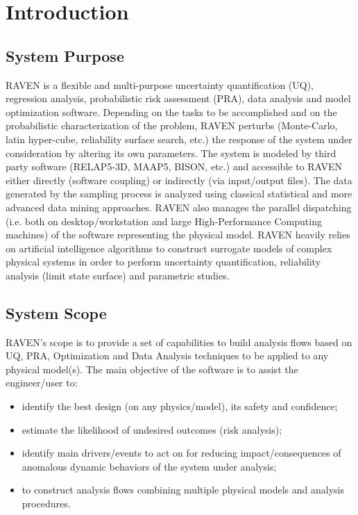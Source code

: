 \section{Introduction}
\subsection{System Purpose}

RAVEN is a flexible and multi-purpose uncertainty quantification (UQ), regression analysis, probabilistic risk assessment 
(PRA), data analysis and model optimization software.  Depending on the tasks to be accomplished and on the 
probabilistic
 characterization of the problem, RAVEN perturbs (Monte-Carlo, latin hyper-cube, reliability surface search, etc.) the
 response of the system under consideration by altering its own parameters. The system is modeled by third party
 software (RELAP5-3D, MAAP5, BISON, etc.) and accessible to RAVEN either directly (software coupling) or
 indirectly (via input/output files). The data generated by the sampling process is analyzed using classical statistical
 and more advanced data mining approaches. RAVEN also manages the parallel dispatching (i.e. both on
 desktop/workstation and large High-Performance Computing machines) of the software representing the physical 
 model. RAVEN heavily relies on artificial intelligence algorithms to construct surrogate models of complex physical
 systems in order to perform uncertainty quantification, reliability analysis (limit state surface) and parametric studies.

\subsection{System Scope}

RAVEN’s scope is to provide a set of capabilities to build analysis flows based on UQ, PRA, Optimization and Data Analysis techniques to be applied to any physical model(s). The main objective of the software is to assist the engineer/user to:
\begin{itemize}
  \item identify the best design (on any physics/model), its safety and confidence;
  \item estimate the likelihood of undesired outcomes (risk analysis);
  \item identify main drivers/events to act on for reducing impact/consequences of anomalous dynamic behaviors of the 
         system under analysis;
  \item to construct analysis flows combining multiple physical models and analysis procedures.
\end{itemize}

